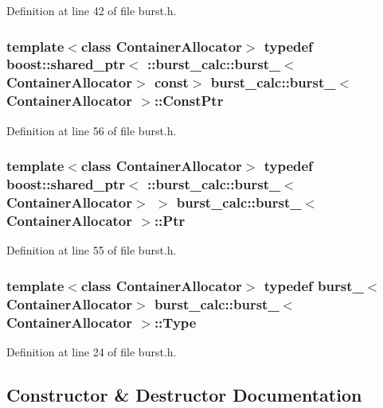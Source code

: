 \-Definition at line 42 of file burst.\-h.

\subsubsection[{\-Const\-Ptr}]{\setlength{\rightskip}{0pt plus 5cm}template$<$class \-Container\-Allocator$>$ typedef boost\-::shared\-\_\-ptr$<$ \-::{\bf burst\-\_\-calc\-::burst\-\_\-}$<$\-Container\-Allocator$>$ const$>$ {\bf burst\-\_\-calc\-::burst\-\_\-}$<$ \-Container\-Allocator $>$\-::{\bf \-Const\-Ptr}}\label{structburst__calc_1_1burst___a3c7f8f62a08c76c6c4d21cae963bcdcf}


\-Definition at line 56 of file burst.\-h.

\subsubsection[{\-Ptr}]{\setlength{\rightskip}{0pt plus 5cm}template$<$class \-Container\-Allocator$>$ typedef boost\-::shared\-\_\-ptr$<$ \-::{\bf burst\-\_\-calc\-::burst\-\_\-}$<$\-Container\-Allocator$>$ $>$ {\bf burst\-\_\-calc\-::burst\-\_\-}$<$ \-Container\-Allocator $>$\-::{\bf \-Ptr}}\label{structburst__calc_1_1burst___ac25fdba624576117485d848de3355090}


\-Definition at line 55 of file burst.\-h.

\subsubsection[{\-Type}]{\setlength{\rightskip}{0pt plus 5cm}template$<$class \-Container\-Allocator$>$ typedef {\bf burst\-\_\-}$<$\-Container\-Allocator$>$ {\bf burst\-\_\-calc\-::burst\-\_\-}$<$ \-Container\-Allocator $>$\-::{\bf \-Type}}\label{structburst__calc_1_1burst___a69a626532122239f9ebb0f500b1359ff}


\-Definition at line 24 of file burst.\-h.



\subsection{\-Constructor \& \-Destructor \-Documentation}
